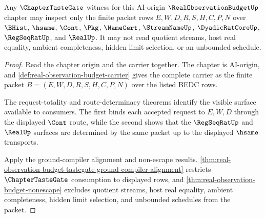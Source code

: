 \begin{theorem}
\label{thm:real-observation-budget-tastegate-visible-surface}
Any $\ChapterTasteGate$ witness for this AI-origin $\RealObservationBudgetUp$ chapter may inspect only the finite packet rows $E,W,D,R,S,H,C,P,N$ over $\BHist$, $\hsame$, $\Cont$, $\Pkg$, $\NameCert$, $\StreamNameUp$, $\DyadicRatCoreUp$, $\RegSeqRatUp$, and $\RealUp$. It may not read quotient streams, host real equality, ambient completeness, hidden limit selection, or an unbounded schedule.
\end{theorem}
\begin{proof}
Read the chapter origin and the carrier together. The chapter is AI-origin, and \autoref{def:real-observation-budget-carrier} gives the complete carrier as the finite packet $B=(E,W,D,R,S,H,C,P,N)$ over the listed BEDC rows.

The request-totality and route-determinacy theorems identify the visible surface available to consumers. The first binds each accepted request to $E,W,D$ through the displayed $\Cont$ route, while the second shows that the $\RegSeqRatUp$ and $\RealUp$ surfaces are determined by the same packet up to the displayed $\hsame$ transports.

Apply the ground-compiler alignment and non-escape results. \autoref{thm:real-observation-budget-tastegate-ground-compiler-alignment} restricts $\ChapterTasteGate$ consumption to displayed rows, and \autoref{thm:real-observation-budget-nonescape} excludes quotient streams, host real equality, ambient completeness, hidden limit selection, and unbounded schedules from the packet.
\end{proof}

